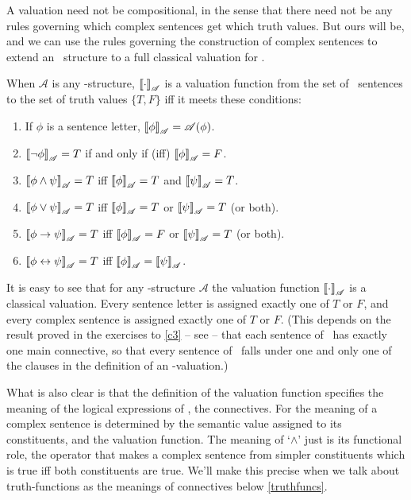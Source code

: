 A valuation need not be compositional, in the sense that there need not be any rules governing which complex sentences get which truth values. But ours will be, and we can use the rules governing the construction of complex sentences to extend an \lone\ structure to a full classical valuation for \lone.
\begin{definition}\label{value}
		When $\mathscr{A}$ is any \lone-structure, $\left\llbracket \cdot\right\rrbracket_{\mathscr{A}}$ is a valuation function from the set of \lone\ sentences to the set of truth values $\{T, F\}$ iff it meets these conditions: \begin{enumerate}
			\item If $\phi$ is a sentence letter, $\left\llbracket \phi\right\rrbracket_{\mathscr{A}} = \mathscr{A}(\phi)$.
			\item $\left\llbracket \neg \phi\right\rrbracket_{\mathscr{A}} = T$ if and only if (iff) $\left\llbracket \phi\right\rrbracket_{\mathscr{A}}= F$.
			\item $\left\llbracket \phi \wedge \psi\right\rrbracket_{\mathscr{A}} = T$ iff $\left\llbracket \phi\right\rrbracket_{\mathscr{A}}=T$ and $\left\llbracket \psi\right\rrbracket_{\mathscr{A}}=T$.
			\item $\left\llbracket \phi \vee \psi\right\rrbracket_{\mathscr{A}} = T$ iff $\left\llbracket \phi\right\rrbracket_{\mathscr{A}}=T$ or $\left\llbracket \psi\right\rrbracket_{\mathscr{A}}=T$ (or both).
			\item $\left\llbracket \phi \to \psi\right\rrbracket_{\mathscr{A}} = T$ iff $\left\llbracket \phi\right\rrbracket_{\mathscr{A}}=F$ or $\left\llbracket \psi\right\rrbracket_{\mathscr{A}}=T$ (or both).
			\item $\left\llbracket \phi \leftrightarrow \psi\right\rrbracket_{\mathscr{A}} = T$ iff $\left\llbracket \phi\right\rrbracket_{\mathscr{A}}=\left\llbracket \psi\right\rrbracket_{\mathscr{A}}$.
		\end{enumerate}
	\end{definition} It is easy to see that for any \lone-structure $\mathscr{A}$ the valuation function $\left\llbracket \cdot\right\rrbracket_{\mathscr{A}}$ is a classical valuation. Every sentence letter is assigned exactly one of $T$ or $F$, and every complex sentence is assigned exactly one of $T$ or $F$. (This depends on the result proved in the exercises to \autoref{c3} – see \pageref{ans3} – that each sentence of \lone\ has exactly one main connective, so that every sentence of \lone\ falls under one and only one of the clauses in the definition of an \lone-valuation.)

What is also clear is that the definition of the valuation function specifies the meaning of the logical expressions of \lone, the connectives. For the meaning of a complex sentence is determined by the semantic value assigned to its constituents, and the valuation function. The meaning of `$\wedge$' just is its functional role, the operator that makes a complex sentence from simpler constituents which is true iff both constituents are true. We'll make this precise when we talk about truth-functions as the meanings of connectives below \autoref{truthfuncs}.


